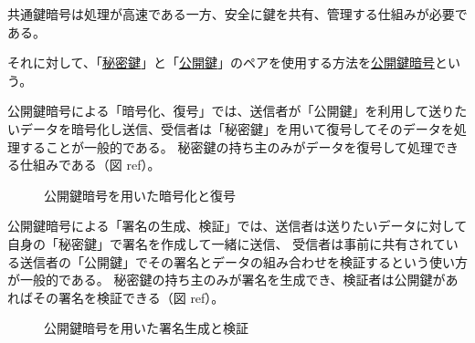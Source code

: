 \documentclass[uplatex]{jsarticle}
\def\ref#1{ref}%
\def\label#1{}%
\begin{document}
\begin{rem}[共通鍵暗号の長所と課題]\label{rem:ch6-symmetric-tradeoff}
共通鍵暗号は処理が高速である一方、安全に鍵を共有、管理する仕組みが必要である。
\end{rem}

\begin{dfn}[公開鍵暗号]\label{dfn:ch6-public-key}
それに対して、「\underline{秘密鍵}」と「\underline{公開鍵}」のペアを使用する方法を\underline{公開鍵暗号}という。
\end{dfn}

公開鍵暗号による「暗号化、復号」では、送信者が「公開鍵」を利用して送りたいデータを暗号化し送信、受信者は「秘密鍵」を用いて復号してそのデータを処理することが一般的である。
秘密鍵の持ち主のみがデータを復号して処理できる仕組みである（図 \ref{fig:ch6-pk-enc}）。

\begin{figure}[H]
\centering
{}
\caption{公開鍵暗号を用いた暗号化と復号}\label{fig:ch6-pk-enc}
\end{figure}

公開鍵暗号による「署名の生成、検証」では、送信者は送りたいデータに対して自身の「秘密鍵」で署名を作成して一緒に送信、
受信者は事前に共有されている送信者の「公開鍵」でその署名とデータの組み合わせを検証するという使い方が一般的である。
秘密鍵の持ち主のみが署名を生成でき、検証者は公開鍵があればその署名を検証できる（図 \ref{fig:ch6-pk-sig}）。

\begin{figure}[H]
\centering
{}
\caption{公開鍵暗号を用いた署名生成と検証}\label{fig:ch6-pk-sig}
\end{figure}
\end{document}
